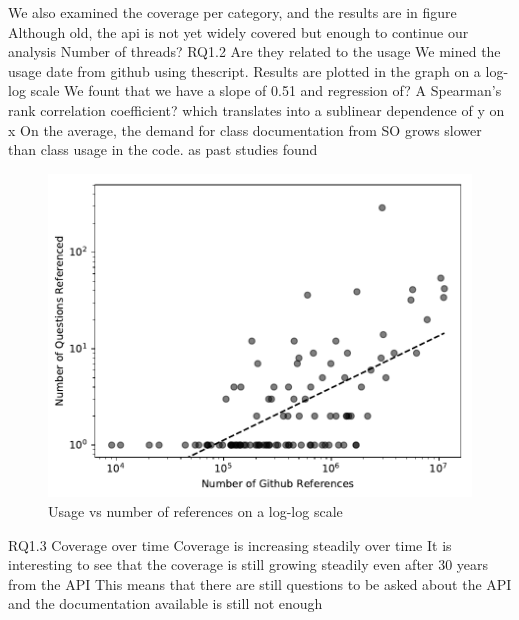 We also examined the coverage per category, and the results are in figure
Although old, the api is not yet widely covered
but enough to continue our analysis
Number of threads? %
RQ1.2
Are they related to the usage
We mined the usage date from github using thescript.
Results are plotted in the graph on a log-log scale
We fount that we have a slope of 0.51 and regression of? %
A Spearman’s rank correlation coefficient?
which translates into a sublinear dependence of y on x
On the average, the demand for class documentation from SO grows slower
than class usage in the code. as past studies found


\begin{figure}
  \includegraphics{scripts/figures/1-2-usage-vs-coverage}
  \caption{Usage vs number of references on a log-log scale}
  \label{usageref}
\end{figure}

RQ1.3
Coverage over time
Coverage is increasing steadily over time
It is interesting to see that the coverage is still growing steadily even after 30 years from the API
This means that there are still questions to be asked about the API and the documentation available is still not enough

